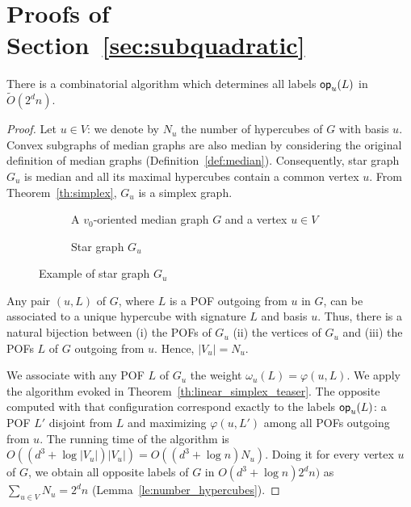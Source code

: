 \documentclass[a4paper,UKenglish,numberwithinsect,cleveref, autoref]{lipics-v2021}
\newcommand{\card}[1]{\left| #1 \right|}
\newcommand{\opp}{\mbox{\textsf{op}}}
\begin{document}
\section{Proofs of Section~\ref{sec:subquadratic}} \label{asec:subquadratic}

\begin{theorem}[Computation of labels \opp]
There is a combinatorial algorithm which determines all labels $\opp_u(L)$ in $\tilde{O}(2^dn)$. 
\label{th:compute_opp}
\end{theorem}
\begin{proof}
Let $u \in V$: we denote by $N_u$ the number of hypercubes of $G$ with basis $u$. Convex subgraphs of median graphs are also median by considering the original definition of median graphs (Definition~\ref{def:median}). Consequently, star graph $G_u$ is median and all its maximal hypercubes contain a common vertex $u$. From Theorem~\ref{th:simplex}, $G_u$ is a simplex graph.

\begin{figure}[h]
\centering
\begin{subfigure}[b]{0.54\columnwidth}
\centering
\scalebox{0.8}{}
\caption{A $v_0$-oriented median graph $G$ and a vertex $u \in V$}
\label{subfig:compute_opposites_1}
\end{subfigure}
\begin{subfigure}[b]{0.44\columnwidth}
\centering
\scalebox{0.8}{}
\caption{Star graph $G_u$}
\label{subfig:compute_opposites_2}
\end{subfigure}

\caption{Example of star graph $G_u$}
\label{fig:compute_opposites}
\end{figure}

Any pair $(u,L)$ of $G$, where $L$ is a POF outgoing from $u$ in $G$, can be associated to a unique hypercube with signature $L$ and basis $u$. Thus, there is a natural bijection between (i) the POFs of $G_u$ (ii) the vertices of $G_u$ and (iii) the POFs $L$ of $G$ outgoing from $u$. Hence, $\card{V_u} = N_u$.

We associate with any POF $L$ of $G_u$ the weight $\omega_u(L) = \varphi(u,L)$. We apply the algorithm evoked in Theorem~\ref{th:linear_simplex_teaser}. The opposite computed with that configuration correspond exactly to the labels $\opp_u(L)$: a POF $L'$ disjoint from $L$ and maximizing $\varphi(u,L')$ among all POFs outgoing from $u$. The running time of the algorithm is $O((d^3+\log \card{V_u})\card{V_u}) = O((d^3+\log n)N_u)$. Doing it for every vertex $u$ of $G$, we obtain all opposite labels of $G$ in $O(d^3+\log n)2^dn)$ as $\sum_{u \in V} N_u = 2^dn$ (Lemma~\ref{le:number_hypercubes}).
\end{proof}
\end{document}
